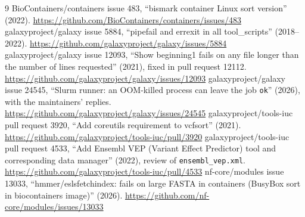 \documentclass[11pt,letterpaper]{article}
\newcommand{\code}[1]{\texttt{#1}}
\begin{document}
\begin{thebibliography}{9}
\small
{} BioContainers/containers issue 483, ``bismark container Linux sort version'' (2022).
\url{https://github.com/BioContainers/containers/issues/483}
 galaxyproject/galaxy issue 5884, ``pipefail and errexit in all tool\_scripts'' (2018--2022).
\url{https://github.com/galaxyproject/galaxy/issues/5884}
 galaxyproject/galaxy issue 12093, ``Show beginning1 fails on any file longer than the number of
lines requested'' (2021), fixed in pull request 12112. \url{https://github.com/galaxyproject/galaxy/issues/12093}
 galaxyproject/galaxy issue 24545, ``Slurm runner: an OOM-killed process can leave the job
\code{ok}'' (2026), with the maintainers' replies. \url{https://github.com/galaxyproject/galaxy/issues/24545}
 galaxyproject/tools-iuc pull request 3920, ``Add coreutils requirement to vcfsort'' (2021).
\url{https://github.com/galaxyproject/tools-iuc/pull/3920}
 galaxyproject/tools-iuc pull request 4533, ``Add Ensembl VEP (Variant Effect Predictor) tool and
corresponding data manager'' (2022), review of \code{ensembl\_vep.xml}. \url{https://github.com/galaxyproject/tools-iuc/pull/4533}
 nf-core/modules issue 13033, ``hmmer/eslsfetchindex: fails on large FASTA in containers (BusyBox
sort in biocontainers image)'' (2026). \url{https://github.com/nf-core/modules/issues/13033}
\end{thebibliography}
\end{document}

